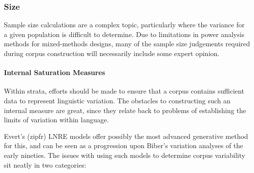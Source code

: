 






\sepline
\subsubsection{Size}
Sample size calculations are a complex topic, particularly where the variance for a given population is difficult to determine.  Due to limitations in power analysis methods for mixed-methods designs, many of the sample size judgements required during corpus construction will necessarily include some expert opinion.



\paragraph{Internal Saturation Measures}
Within strata, efforts should be made to ensure that a corpus contains sufficient data to represent linguistic variation.  The obstacles to constructing such an internal measure are great, since they relate back to problems of establishing the limits of variation within language.

Evert's (zipfr) LNRE models offer possibly the most advanced generative method for this, and can be seen as a progression upon Biber's variation analyses of the early nineties.  The issues with using such models to determine corpus variability sit neatly in two categories:

